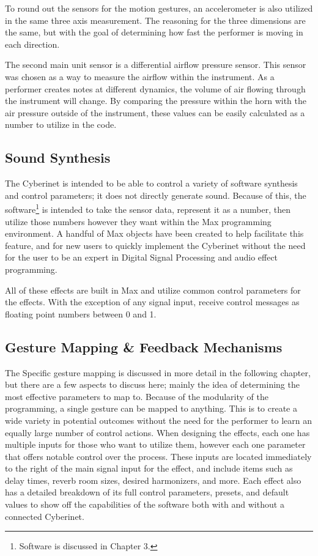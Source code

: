 To round out the sensors for the motion gestures, an accelerometer is also utilized in the same three axis measurement. The reasoning for the three dimensions are the same, but with the goal of determining how fast the performer is moving in each direction.

The second main unit sensor is a differential airflow pressure sensor. This sensor was chosen as a way to measure the airflow within the instrument. As a performer creates notes at different dynamics, the volume of air flowing through the instrument will change. By comparing the pressure within the horn with the air pressure outside of the instrument, these values can be easily calculated as a number to utilize in the code.

\subsection{Sound Synthesis}

The Cyberinet is intended to be able to control a variety of software synthesis and control parameters; it does not directly generate sound. Because of this, the software\footnote{Software is discussed in Chapter 3.} is intended to take the sensor data, represent it as a number, then utilize those numbers however they want within the Max programming environment. A handful of Max objects have been created to help facilitate this feature, and for new users to quickly implement the Cyberinet without the need for the user to be an expert in Digital Signal Processing and audio effect programming.

All of these effects are built in Max and utilize common control parameters for the effects. With the exception of any signal input, receive control messages as floating point numbers between 0 and 1.

\subsection{Gesture Mapping \& Feedback Mechanisms}

The Specific gesture mapping is discussed in more detail in the following chapter, but there are a few aspects to discuss here; mainly the idea of determining the most effective parameters to map to. Because of the modularity of the programming, a single gesture can be mapped to anything. This is to create a wide variety in potential outcomes without the need for the performer to learn an equally large number of control actions. When designing the effects, each one has multiple inputs for those who want to utilize them, however each one parameter that offers notable control over the process. These inputs are located immediately to the right of the main signal input for the effect, and include items such as delay times, reverb room sizes, desired harmonizers, and more. Each effect also has a detailed breakdown of its full control parameters, presets, and default values to show off the capabilities of the software both with and without a connected Cyberinet.

